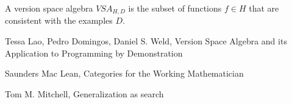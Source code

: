 \documentclass{article}
\theoremstyle{definition}
\begin{document}
A version space algebra $VSA_{H,D}$ is the subset of functions $f\in H$ that are consistent with the examples $D$.



\begin{thebibliography}{9}
Tessa Lao, Pedro Domingos, Daniel S. Weld, Version Space Algebra and its Application to Programming by Demonstration

Saunders Mac Lean, Categories for the Working Mathematician

Tom M. Mitchell, Generalization as search
\end{thebibliography}
\end{document}
